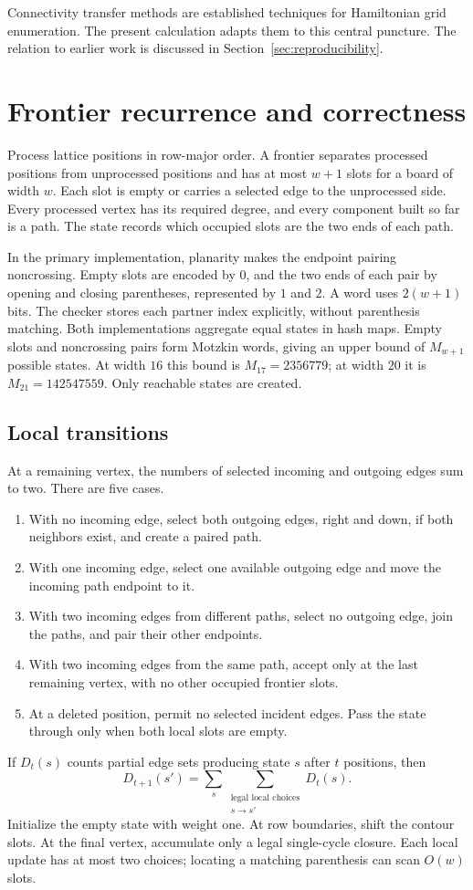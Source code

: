 \documentclass[12pt]{amsart}
\begin{document}
Connectivity transfer methods are established techniques for Hamiltonian
grid enumeration. The present calculation adapts them to this central
puncture. The relation to earlier work is discussed in
Section~\ref{sec:reproducibility}.

\section{Frontier recurrence and correctness}
Process lattice positions in row-major order. A frontier separates
processed positions from unprocessed positions and has at most $w+1$ slots
for a board of width $w$. Each slot is empty or carries a selected edge to
the unprocessed side. Every processed vertex has its required degree, and
every component built so far is a path. The state records which occupied
slots are the two ends of each path.

In the primary implementation, planarity makes the endpoint pairing
noncrossing. Empty slots are encoded by $0$, and the two ends of each pair
by opening and closing parentheses, represented by $1$ and $2$.
A word uses $2(w+1)$ bits. The checker stores each partner index explicitly,
without parenthesis matching. Both implementations aggregate equal states
in hash maps. Empty slots and noncrossing pairs form Motzkin words, giving
an upper bound of $M_{w+1}$ possible states. At width $16$ this bound is
$M_{17}=2356779$; at width $20$ it is $M_{21}=142547559$.
Only reachable states are created.

\subsection{Local transitions}
At a remaining vertex, the numbers of selected incoming and outgoing
edges sum to two. There are five cases.
\begin{enumerate}
\item With no incoming edge, select both outgoing edges, right and down,
if both neighbors exist, and create a paired path.
\item With one incoming edge, select one available outgoing edge and move
the incoming path endpoint to it.
\item With two incoming edges from different paths, select no outgoing
edge, join the paths, and pair their other endpoints.
\item With two incoming edges from the same path, accept only at the last
remaining vertex, with no other occupied frontier slots.
\item At a deleted position, permit no selected incident edges. Pass the
state through only when both local slots are empty.
\end{enumerate}
If $D_t(s)$ counts partial edge sets producing state $s$ after $t$ positions,
then
\[
D_{t+1}(s')=\sum_{s}\sum_{\substack{\text{legal local choices}\\s\longrightarrow s'}}D_t(s).
\]
Initialize the empty state with weight one. At row boundaries, shift the
contour slots. At the final vertex, accumulate only a legal single-cycle
closure. Each local update has at most two choices; locating a matching
parenthesis can scan $O(w)$ slots.
\end{document}
